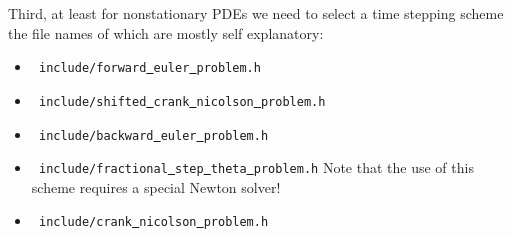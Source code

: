 Third, at least for nonstationary PDEs we need to select a time stepping scheme
the file names of which are mostly self explanatory:
\begin{itemize}
\item \texttt{ include/forward\underline{ }euler\underline{ }problem.h}
\item \texttt{ include/shifted\underline{ }crank\underline{ }nicolson\underline{ }problem.h}
\item \texttt{ include/backward\underline{ }euler\underline{ }problem.h}
\item \texttt{ include/fractional\underline{ }step\underline{ }theta\underline{ }problem.h} Note that the use of this scheme requires a special Newton solver!
\item \texttt{ include/crank\underline{ }nicolson\underline{ }problem.h}
\end{itemize}


